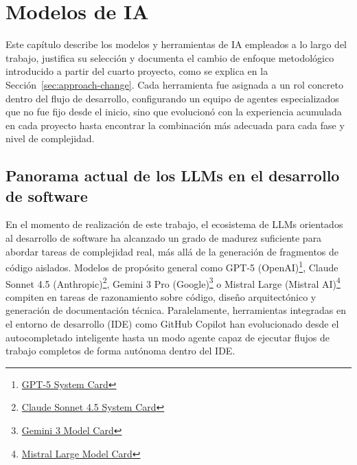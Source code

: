 
\cleardoublepage
\chapter{Modelos de IA} \label{chap:AIModels}

Este capítulo describe los modelos y herramientas de \ac{IA} empleados a lo largo del trabajo, justifica su selección y documenta el cambio de enfoque metodológico introducido a partir del cuarto proyecto, como se explica en la Sección~\ref{sec:approach-change}. Cada herramienta fue asignada a un rol concreto dentro del flujo de desarrollo, configurando un equipo de agentes especializados que no fue fijo desde el inicio, sino que evolucionó con la experiencia acumulada en cada proyecto hasta encontrar la combinación más adecuada para cada fase y nivel de complejidad.

\section{Panorama actual de los LLMs en el desarrollo de software} \label{sec:llm-overview}

En el momento de realización de este trabajo, el ecosistema de \ac{LLMs} orientados al desarrollo de software ha alcanzado un grado de madurez suficiente para abordar tareas de complejidad real, más allá de la generación de fragmentos de código aislados.
Modelos de propósito general como GPT-5 (OpenAI)\footnote{ \href{https://cdn.openai.com/gpt-5-system-card.pdf}{GPT-5 System Card}}, Claude Sonnet 4.5 (Anthropic)\footnote{\href{https://www.anthropic.com/claude-sonnet-4-5-system-card}{Claude Sonnet 4.5 System Card}}, Gemini 3 Pro (Google)\footnote{\href{https://storage.googleapis.com/deepmind-media/Model-Cards/Gemini-3-Pro-Model-Card.pdf}{Gemini 3 Model Card}} o Mistral Large (Mistral AI)\footnote{\href{https://docs.mistral.ai/models/model-cards/mistral-large-2-0-24-07}{Mistral Large Model Card}} compiten en tareas de razonamiento sobre código, diseño arquitectónico y generación de documentación técnica.
Paralelamente, herramientas integradas en el entorno de desarrollo (IDE) como GitHub Copilot han evolucionado desde el autocompletado inteligente hasta un modo agente capaz de ejecutar flujos de trabajo completos de forma autónoma dentro del \ac{IDE}.\\

